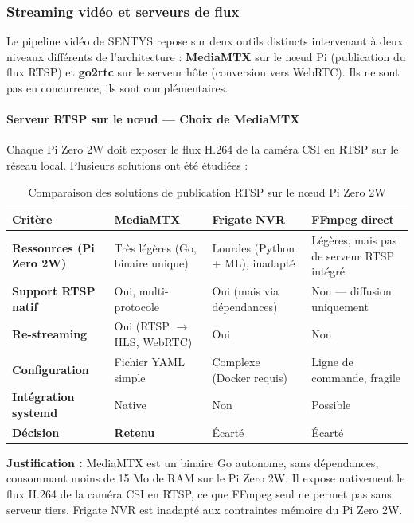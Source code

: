 \documentclass[12pt,a4paper]{article}
\begin{document}
\subsubsection{Streaming vidéo et serveurs de flux}

Le pipeline vidéo de SENTYS repose sur deux outils distincts intervenant à deux niveaux différents de l'architecture : \textbf{MediaMTX} sur le nœud Pi (publication du flux RTSP) et \textbf{go2rtc} sur le serveur hôte (conversion vers WebRTC). Ils ne sont pas en concurrence, ils sont complémentaires.

\paragraph{Serveur RTSP sur le nœud --- Choix de MediaMTX}

Chaque Pi Zero 2W doit exposer le flux H.264 de la caméra CSI en RTSP sur le réseau local. Plusieurs solutions ont été étudiées :

\begin{table}[H]
\centering
\small
\renewcommand{\arraystretch}{1.3}
\begin{tabular}{|l|p{3cm}|p{3cm}|p{3cm}|}
\hline
\textbf{Critère} & \textbf{MediaMTX} & \textbf{Frigate NVR} & \textbf{FFmpeg direct} \\
\hline
\textbf{Ressources (Pi Zero 2W)} & Très légères (Go, binaire unique) & Lourdes (Python + ML), inadapté & Légères, mais pas de serveur RTSP intégré \\
\hline
\textbf{Support RTSP natif} & Oui, multi-protocole & Oui (mais via dépendances) & Non --- diffusion uniquement \\
\hline
\textbf{Re-streaming} & Oui (RTSP $\rightarrow$ HLS, WebRTC) & Oui & Non \\
\hline
\textbf{Configuration} & Fichier YAML simple & Complexe (Docker requis) & Ligne de commande, fragile \\
\hline
\textbf{Intégration systemd} & Native & Non & Possible \\
\hline
\textbf{Décision} & \textcolor{green!60!black}{\textbf{Retenu}} & Écarté & Écarté \\
\hline
\end{tabular}
\caption{Comparaison des solutions de publication RTSP sur le nœud Pi Zero 2W}
\end{table}

\begin{infobox}
\textbf{Justification :} MediaMTX est un binaire Go autonome, sans dépendances, consommant moins de 15 Mo de RAM sur le Pi Zero 2W. Il expose nativement le flux H.264 de la caméra CSI en RTSP, ce que FFmpeg seul ne permet pas sans serveur tiers. Frigate NVR est inadapté aux contraintes mémoire du Pi Zero 2W.
\end{infobox}
\end{document}
